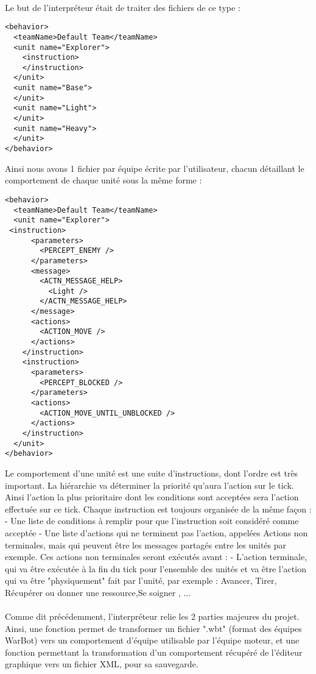 \documentclass{report}
\begin{document}
\paragraph{}
Le but de l'interpréteur était de traiter des fichiers de ce type :
\begin{lstlisting}[frame=single]
<behavior>
  <teamName>Default Team</teamName>
  <unit name="Explorer">
    <instruction>
    </instruction>
  </unit>
  <unit name="Base">
  </unit>
  <unit name="Light">
  </unit>
  <unit name="Heavy">
  </unit>
</behavior>
\end{lstlisting}
Ainsi nous avons 1 fichier par équipe écrite par l'utilisateur, chacun détaillant le comportement de chaque unité sous la même forme :
\begin{lstlisting}[frame=single]
<behavior>
  <teamName>Default Team</teamName>
  <unit name="Explorer">
 <instruction>
      <parameters>
        <PERCEPT_ENEMY />
      </parameters>
      <message>
        <ACTN_MESSAGE_HELP>
          <Light />
        </ACTN_MESSAGE_HELP>
      </message>
      <actions>
        <ACTION_MOVE />
      </actions>
    </instruction>
    <instruction>
      <parameters>
        <PERCEPT_BLOCKED />
      </parameters>
      <actions>
        <ACTION_MOVE_UNTIL_UNBLOCKED />
      </actions>
    </instruction>
  </unit>
</behavior>
\end{lstlisting}
Le comportement d'une unité est une suite d'instructions, dont l'ordre est très important. La hiérarchie va déterminer la priorité qu'aura l'action sur le tick. Ainsi l'action la plus prioritaire dont les conditions sont acceptées sera l'action effectuée sur ce tick.
Chaque instruction est toujours organisée de la même façon :
- Une liste de conditions à remplir pour que l'instruction soit considéré comme acceptée
- Une liste d'actions qui ne terminent pas l'action, appelées Actions non terminales, mais qui peuvent être les messages partagés entre les unités par exemple. Ces actions non terminales seront exécutés avant :
- L'action terminale, qui va être exécutée à la fin du tick pour l'ensemble des unités et va être l'action qui va être "physiquement" fait par l'unité, par exemple : Avancer, Tirer, Récupérer ou donner une ressource,Se soigner , ...
\paragraph{}
Comme dit précédemment, l'interpréteur relie les 2 parties majeures du projet.
Ainsi, une fonction permet de transformer un fichier ".wbt" (format des équipes WarBot) vers un comportement d'équipe utilisable par l'équipe moteur, et une fonction permettant la transformation d'un comportement récupéré de l'éditeur graphique vers un fichier XML, pour sa sauvegarde.
\newpage
\end{document}
